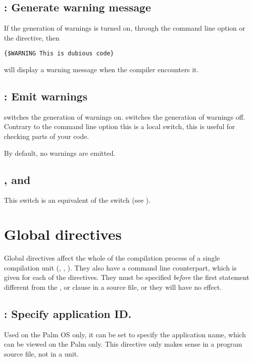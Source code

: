 \subsection{ : Generate warning message}

If the generation of warnings is turned on, through the 
command line option or the  directive, then
\begin{verbatim}
{$WARNING This is dubious code}
\end{verbatim}
will display a warning message when the compiler encounters it.

\subsection{ : Emit warnings}

 switches the generation of warnings on.
 switches the generation of warnings off.
Contrary to the command line option  this
is a local switch, this is useful for checking parts of your code.

By default, no warnings are emitted.

\subsection{,  and }

This switch is an equivalent of the  switch
(see ).

\section{Global directives}
\label{se:GlobalSwitch}
Global directives affect the whole of the compilation process of a single
compilation unit (, , ). They also
have a command line counterpart, which is given for each of the directives.
They must be specified {\em before} the first statement different from the
,  or  clause in a source file, or they
will have no effect.

\subsection{ : Specify application ID.}
Used on the Palm OS only, it can be set to specify the application name,
which can be viewed on the Palm only. This directive only makes sense in a
program source file, not in a unit.

